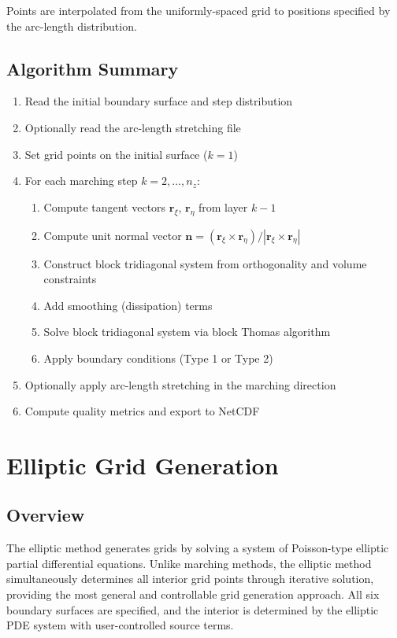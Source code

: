 \documentclass[11pt,a4paper]{report}
\newcommand{\rvec}{\bm{r}}
\newcommand{\nvec}{\bm{n}}
\begin{document}
Points are interpolated from the uniformly-spaced grid to positions specified by the arc-length distribution.

\section{Algorithm Summary}

\begin{enumerate}
    \item Read the initial boundary surface and step distribution
    \item Optionally read the arc-length stretching file
    \item Set grid points on the initial surface ($k=1$)
    \item For each marching step $k = 2, \dots, n_z$:
    \begin{enumerate}
        \item Compute tangent vectors $\rvec_\xi$, $\rvec_\eta$ from layer $k-1$
        \item Compute unit normal vector $\nvec = (\rvec_\xi \times \rvec_\eta) / |\rvec_\xi \times \rvec_\eta|$
        \item Construct block tridiagonal system from orthogonality and volume constraints
        \item Add smoothing (dissipation) terms
        \item Solve block tridiagonal system via block Thomas algorithm
        \item Apply boundary conditions (Type 1 or Type 2)
    \end{enumerate}
    \item Optionally apply arc-length stretching in the marching direction
    \item Compute quality metrics and export to NetCDF
\end{enumerate}

\chapter{Elliptic Grid Generation}

\section{Overview}

The elliptic method generates grids by solving a system of Poisson-type elliptic partial differential equations. Unlike marching methods, the elliptic method simultaneously determines all interior grid points through iterative solution, providing the most general and controllable grid generation approach. All six boundary surfaces are specified, and the interior is determined by the elliptic PDE system with user-controlled source terms.
\end{document}
